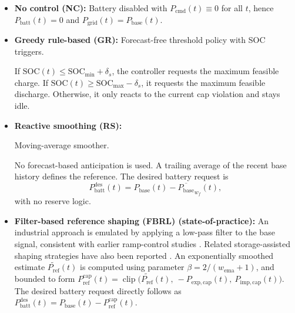 \documentclass[preprint,12pt]{elsarticle}
\newcommand{\SOC}{\mathrm{SOC}}
\newcommand{\Pbatt}{P_{\mathrm{batt}}}
\newcommand{\Pcmd}{P_{\mathrm{cmd}}}
\newcommand{\Pref}{P_{\mathrm{ref}}}
\newcommand{\Pgrid}{P_{\mathrm{grid}}}
\newcommand{\Pbase}{P_{\mathrm{base}}}
\DeclareMathOperator{\clip}{clip}
\begin{document}
\begin{itemize}
\item \textbf{No control (NC):} Battery disabled with $\Pcmd(t)\equiv 0$ for all $t$, hence $\Pbatt(t)=0$ and $\Pgrid(t)=\Pbase(t)$.

\item \textbf{Greedy rule-based (GR):} Forecast-free threshold policy with SOC triggers.\par
If $\SOC(t)\le \SOC_{\min}+\delta_s$, the controller requests the maximum feasible charge. If $\SOC(t)\ge \SOC_{\max}-\delta_s$, it requests the maximum feasible discharge. Otherwise, it only reacts to the current cap violation and stays idle.

\item \textbf{Reactive smoothing (RS):}\par
Moving-average smoother.\par
No forecast-based anticipation is used. A trailing average of the recent base history defines the reference. The desired battery request is
\[
\Pbatt^{\mathrm{des}}(t)=\Pbase(t)-\overline{\Pbase}_{w_f}(t),
\]
with no reserve logic.

\item \textbf{Filter-based reference shaping (FBRL) (state-of-practice):}
An industrial approach is emulated by applying a low-pass filter to the base signal, consistent with earlier ramp-control studies \cite{marcos2014}. Related storage-assisted shaping strategies have also been reported \cite{damico2022}. An exponentially smoothed estimate $\widetilde{\Pref}(t)$ is computed using parameter $\beta=2/(w_{\mathrm{ema}}+1)$, and bounded to form $\Pref^{\mathrm{cap}}(t)=\clip\!\big(\widetilde{\Pref}(t),\ -P_{\mathrm{exp,cap}}(t),\ P_{\mathrm{imp,cap}}(t)\big)$. The desired battery request directly follows as $\Pbatt^{\mathrm{des}}(t)=\Pbase(t)-\Pref^{\mathrm{cap}}(t)$.


\end{itemize}
\end{document}
